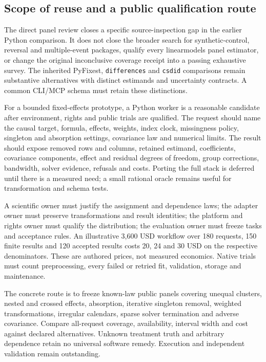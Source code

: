 \subsection{Scope of reuse and a public qualification route}
The direct panel review closes a specific source-inspection gap in the
earlier Python comparison. It does not close the broader search for
synthetic-control, reversal and multiple-event packages, qualify every
linearmodels panel estimator, or change the original inconclusive coverage
receipt into a passing exhaustive survey. The inherited PyFixest,
\texttt{differences} and \texttt{csdid} comparisons remain substantive
alternatives with distinct estimands and uncertainty contracts. A common
CLI/MCP schema must retain these distinctions.
\citep{exec24_lmpanel_reference}

For a bounded fixed-effects prototype, a Python worker is a reasonable
candidate after environment, rights and public trials are qualified.
The request should name the causal target, formula, effects, weights,
index clock, missingness policy, singleton and absorption settings,
covariance law and numerical limits. The result should expose removed rows
and columns, retained estimand, coefficients, covariance components,
effect and residual degrees of freedom, group corrections, bandwidth,
solver evidence, refusals and costs. Porting the full stack is deferred
until there is a measured need; a small rational oracle remains useful
for transformation and schema tests.\citep{exec24_lmpanel_reference}

A scientific owner must justify the assignment and dependence laws; the
adapter owner must preserve transformations and result identities; the
platform and rights owner must qualify the distribution; the evaluation
owner must freeze tasks and acceptance rules. An illustrative 3,600 USD
workflow over 180 requests, 150 finite results and 120 accepted results
costs 20, 24 and 30 USD on the respective denominators. These are authored
prices, not measured economics. Native trials must count preprocessing,
every failed or retried fit, validation, storage and maintenance.
\citep{exec24_lmpanel_reference}

The concrete route is to freeze known-law public panels covering unequal
clusters, nested and crossed effects, absorption, iterative singleton
removal, weighted transformations, irregular calendars, sparse solver
termination and adverse covariance. Compare all-request coverage,
availability, interval width and cost against declared alternatives.
Unknown treatment truth and arbitrary dependence retain no universal
software remedy. Execution and independent validation remain outstanding.
\citep{exec24_lmpanel_reference}
